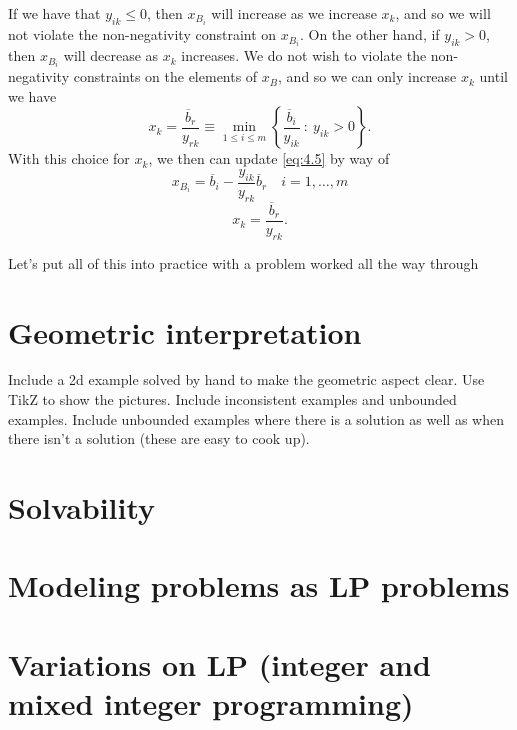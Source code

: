 \documentclass[12pt,english]{article}
\begin{document}
If we have that $y_{ik} \leq 0$, then $x_{B_i}$ will increase as we increase $x_k$, and so we will not violate the non-negativity constraint on $x_{B_i}$.   On the other hand, if $y_{ik} >0$, then $x_{B_i}$ will decrease as $x_k$ increases.  We do not wish to violate the non-negativity constraints on the elements of $x_B$, and so we can only increase $x_k$ until we have 
$$
x_k = \frac{\overline{b}_r}{y_{rk}} \equiv \min_{1 \leq i \leq m} \left\{ \frac{\overline{b}_i}{y_{ik}} ~:~ y_{ik} >0 \right\}.
$$
With this choice for $x_k$, we then can update \eqref{eq:4.5} by way of 
$$
x_{B_i} = \overline{b}_i - \frac{y_{ik}}{y_{rk}} \overline{b}_r \quad i=1,\dots,m
$$
$$
x_k = \frac{\overline{b}_r}{y_{rk}}.
$$

Let's put all of this into practice with a problem worked all the way through \cite{BaJaSh:90}

\section{Geometric interpretation}

Include a 2d example solved by hand to make the geometric aspect clear.  Use TikZ to show the pictures.   Include inconsistent examples and unbounded examples.  Include unbounded examples where there is a solution as well as when there isn't a solution (these are easy to cook up).

\section{Solvability}

\section{Modeling problems as LP problems}

\section{Variations on LP (integer and mixed integer programming)}

{}

\end{document}
